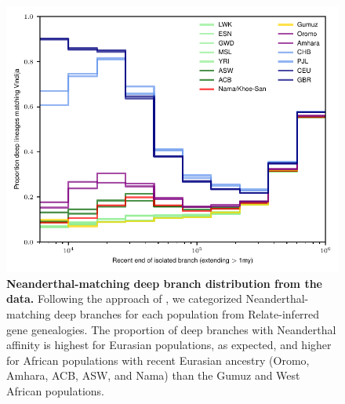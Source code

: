 \documentclass[]{article}
\begin{document}
\begin{figure}[ht]
    \centering
    \includegraphics{figures/supp-deep-brances-data}
    \caption{
        \textbf{Neanderthal-matching deep branch distribution from the data.}
        Following the approach of \citet{Speidel2019-nj}, we categorized
        Neanderthal-matching deep branches for each population from
        Relate-inferred gene genealogies. The proportion of deep branches with
        Neanderthal affinity is highest for Eurasian populations, as expected,
        and higher for African populations with recent Eurasian ancestry
        (Oromo, Amhara, ACB, ASW, and Nama) than the Gumuz and West African
        populations. 
    }
    \label{fig:supp-deep-branches}
\end{figure}
\end{document}
